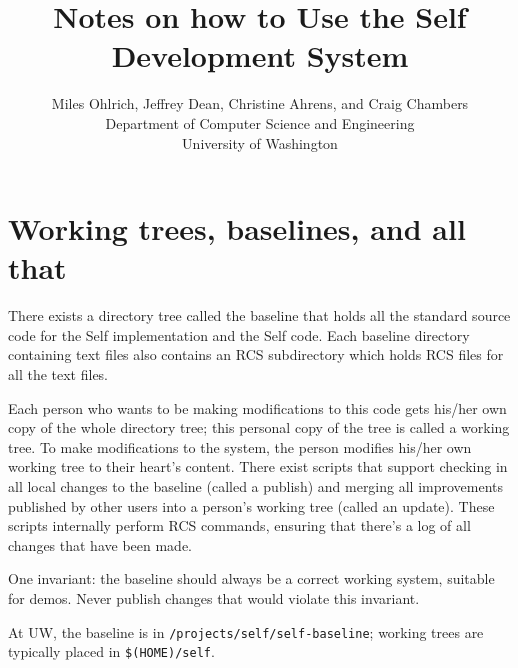 
\title{Notes on how to Use the Self Development System}
\author{Miles Ohlrich, Jeffrey Dean, Christine Ahrens, and Craig Chambers\\ 
Department of Computer Science and Engineering \\
University of Washington}
\newcommand{\Ditem}[1]{\item{\bf{#1:}}}
\newcommand{\bi}{\begin{itemize}}
\newcommand{\ei}{\end{itemize}}
\newcommand{\bq}{\begin{quote}}
\newcommand{\eq}{\end{quote}}
\pagestyle{empty}



\maketitle

\section{Working trees, baselines, and all that}

There exists a directory tree called the baseline that holds all the
standard source code for the Self implementation and the Self code.
Each baseline directory containing text files also contains an RCS
subdirectory which holds RCS files for all the text files.

Each person who wants to be making modifications to this code gets
his/her own copy of the whole directory tree; this personal copy of
the tree is called a working tree.  To make modifications to the
system, the person modifies his/her own working tree to their heart's
content.  There exist scripts that support checking in all local
changes to the baseline (called a publish) and merging all
improvements published by other users into a person's working tree
(called an update).  These scripts internally perform RCS commands,
ensuring that there's a log of all changes that have been made.

One invariant: the baseline should always be a correct working system,
suitable for demos.  Never publish changes that would violate this
invariant.

At UW, the baseline is in {\tt /projects/self/self-baseline}; working
trees are typically placed in {\tt \$(HOME)/self}.


